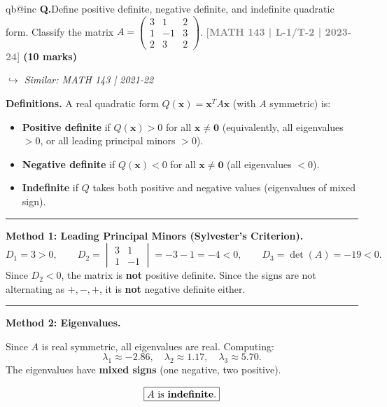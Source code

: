 \documentclass[12pt,a3paper]{article}
\makeatletter
\newcommand{\yr}[1]{\hfill\textcolor{gray}{\small\textbf{[#1]}}}
\newcommand{\mk}[1]{\textcolor{orange!70!black}{\small\textbf{(#1 marks)}}}
\newcommand{\variant}[1]{\par\vspace{1pt}\textcolor{blue!50!black}%
  {\footnotesize\textit{$\hookrightarrow$ Similar: #1}}}
\newcounter{qnum}
\newcommand{\Q}[1]{%
  \csname qb@inc\endcsname
  \needspace{4\baselineskip}
  \refstepcounter{qnum}
  \vspace{6pt}
  \noindent\textbf{Q\theqnum.}\enspace #1\par
}
\makeatother
\begin{document}
\Q{Define positive definite, negative definite, and indefinite quadratic form. Classify the matrix $A = \begin{pmatrix} 3 & 1 & 2 \\ 1 & -1 & 3 \\ 2 & 3 & 2 \end{pmatrix}$.
\yr{MATH 143 | L-1/T-2 | 2023-24} \mk{10}
\variant{MATH 143 | 2021-22}}

\begin{tcolorbox}[enhanced,breakable,
  colback=cE!4,colframe=cE,boxrule=0.8pt,arc=5pt,
  title={\textbf{Answer --- Classification of Quadratic Form for $A=\begin{pmatrix}3&1&2\\1&-1&3\\2&3&2\end{pmatrix}$}},
  fonttitle=\bfseries\color{white},colbacktitle=cE]
 
\textbf{Definitions.}
A real quadratic form $Q(\mathbf{x}) = \mathbf{x}^T A\mathbf{x}$ (with $A$ symmetric) is:
\begin{itemize}[itemsep=2pt]
  \item \textbf{Positive definite} if $Q(\mathbf{x}) > 0$ for all $\mathbf{x} \neq \mathbf{0}$
        (equivalently, all eigenvalues $> 0$, or all leading principal minors $> 0$).
  \item \textbf{Negative definite} if $Q(\mathbf{x}) < 0$ for all $\mathbf{x} \neq \mathbf{0}$
        (all eigenvalues $< 0$).
  \item \textbf{Indefinite} if $Q$ takes both positive and negative values
        (eigenvalues of mixed sign).
\end{itemize}
 
\medskip\textcolor{cE}{\rule{\textwidth}{0.4pt}}
 
\textbf{Method 1: Leading Principal Minors (Sylvester's Criterion).}
\[
  D_1 = 3 > 0, \qquad
  D_2 = \begin{vmatrix}3&1\\1&-1\end{vmatrix} = -3-1 = -4 < 0, \qquad
  D_3 = \det(A) = -19 < 0.
\]
Since $D_2 < 0$, the matrix is \textbf{not} positive definite.
Since the signs are not alternating as $+,-,+$, it is \textbf{not} negative definite either.
 
\medskip\textcolor{cE}{\rule{\textwidth}{0.4pt}}
 
\textbf{Method 2: Eigenvalues.}
 
Since $A$ is real symmetric, all eigenvalues are real. Computing:
\[
  \lambda_1 \approx -2.86, \quad \lambda_2 \approx 1.17, \quad \lambda_3 \approx 5.70.
\]
The eigenvalues have \textbf{mixed signs} (one negative, two positive).
 
\medskip
\[
  \boxed{A \text{ is \textbf{indefinite}}.}
\]
 
\end{tcolorbox}
 
\end{document}
